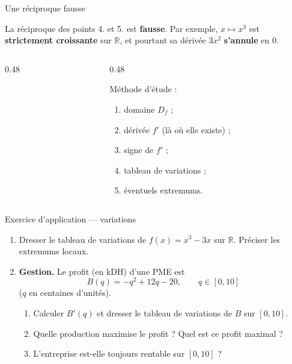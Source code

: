 \documentclass[aspectratio=169,11pt]{beamer}
\newcommand{\R}{\mathbb{R}}
\newcommand{\key}[1]{\textbf{\color{DarkBlue}#1}}
\newcommand{\important}[1]{\textbf{\color{DarkRed}#1}}
\begin{document}
\begin{frame}{Une réciproque fausse}
	\begin{attentionbox}
		La réciproque des points 4. et 5. est \important{fausse}.
		Par exemple, $x\longmapsto x^3$ est \key{strictement croissante} sur $\R$,
		et pourtant sa dérivée $3x^2$ \important{s'annule} en $0$.
	\end{attentionbox}
	\vspace{0.15cm}
	\begin{columns}[c]
		\begin{column}{0.48\textwidth}
		\end{column}
		\begin{column}{0.48\textwidth}
			\begin{applicationbox}
				Méthode d'étude :
				\begin{enumerate}
					\item domaine $D_f$ ;
					\item dérivée $f'$ (là où elle existe) ;
					\item signe de $f'$ ;
					\item tableau de variations ;
					\item éventuels extremums.
				\end{enumerate}
			\end{applicationbox}
		\end{column}
	\end{columns}
\end{frame}

\begin{frame}{Exercice d'application --- variations}
	\begin{exercicebox}[Exercice 2.8]
		\begin{enumerate}
			\item Dresser le tableau de variations de $f(x)=x^3-3x$ sur $\R$.
			Préciser les extremums locaux.
			\item \textbf{Gestion.} Le profit (en kDH) d'une PME est
			\[
				B(q)=-q^2+12q-20, \qquad q\in[0,10]
			\]
			($q$ en centaines d'unités).
			\begin{enumerate}
				\item Calculer $B'(q)$ et dresser le tableau de variations de $B$ sur $[0,10]$.
				\item Quelle production maximise le profit ? Quel est ce profit maximal ?
				\item L'entreprise est-elle toujours rentable sur $[0,10]$ ?
			\end{enumerate}
		\end{enumerate}
	\end{exercicebox}
\end{frame}
\end{document}
